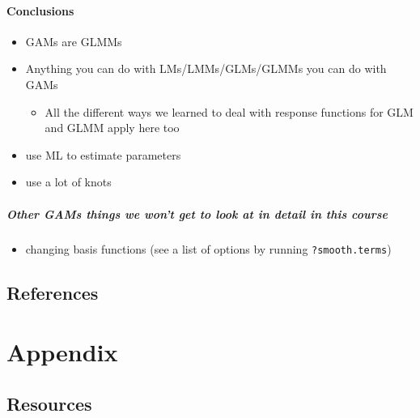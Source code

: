 \documentclass[
  openany]{book}
\providecommand{\tightlist}{%
  \setlength{\itemsep}{0pt}\setlength{\parskip}{0pt}}
\begin{document}
\hypertarget{conclusions}{%
\subsection{Conclusions}\label{conclusions}}

\begin{itemize}
\item
  GAMs are GLMMs
\item
  Anything you can do with LMs/LMMs/GLMs/GLMMs you can do with GAMs

  \begin{itemize}
  \tightlist
  \item
    All the different ways we learned to deal with response functions for GLM and GLMM apply here too
  \end{itemize}
\item
  use ML to estimate parameters
\item
  use a lot of knots
\end{itemize}

\hypertarget{other-gams-things-we-wont-get-to-look-at-in-detail-in-this-course}{%
\subsubsection{Other GAMs things we won't get to look at in detail in this course}\label{other-gams-things-we-wont-get-to-look-at-in-detail-in-this-course}}

\begin{itemize}
\tightlist
\item
  changing basis functions (see a list of options by running \texttt{?smooth.terms})
\end{itemize}

\hypertarget{references-1}{%
\chapter*{References}\label{references-1}}

\hypertarget{part-appendix}{%
\part*{Appendix}\label{part-appendix}}

\hypertarget{resources}{%
\chapter{Resources}\label{resources}}
\end{document}
